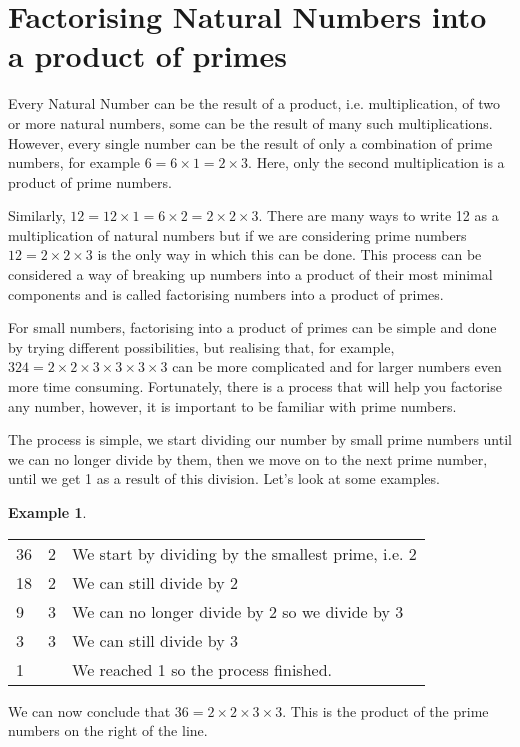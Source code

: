 \documentclass[11pt, oneside]{article}
\theoremstyle{definition}
\newtheorem{exmp}{Example}[section]
\begin{document}
\section{Factorising Natural Numbers into a product of primes}

Every Natural Number can be the result of a product, i.e. multiplication, of two or more natural numbers, some can be the result of many such multiplications. However, every single number can be the result of only a combination of prime numbers, for example $6 = 6\times 1 = 2 \times 3$. Here, only the second multiplication is a product of prime numbers. 

Similarly, $12 = 12 \times 1 = 6 \times 2 = 2\times 2 \times 3$. There are many ways to write 12 as a multiplication of natural numbers but if we are considering prime numbers $12 = 2\times 2\times 3$ is the only way in which this can be done. This process can be considered a way of breaking up numbers into a product of their most minimal components and is called factorising numbers into a product of primes. 

For small numbers, factorising into a product of primes can be simple and done by trying different possibilities, but realising that, for example, $324 = 2\times 2\times 3\times 3\times 3\times 3$ can be more complicated and for larger numbers even more time consuming. Fortunately, there is a process that will help you factorise any number, however, it is important to be familiar with prime numbers.

The process is simple, we start dividing our number by small prime numbers until we can no longer divide by them, then we move on to the next prime number, until we get 1 as a result of this division. Let's look at some examples.

\begin{exmp} \end{exmp}
\begin{tabular}{ p{0.5cm} | p{1.5cm}  p{10cm}}
36 & 2 & We start by dividing by the smallest prime, i.e. 2 \\
18 & 2 & We can still divide by 2  \\
9 & 3 & We can no longer divide by 2 so we divide by 3 \\
3 & 3 & We can still divide by 3 \\
1 &  & We reached 1 so the process finished.
\end{tabular}

We can now conclude that $36 = 2\times 2\times 3\times 3$. This is the product of the prime numbers on the right of the line.
\end{document}
